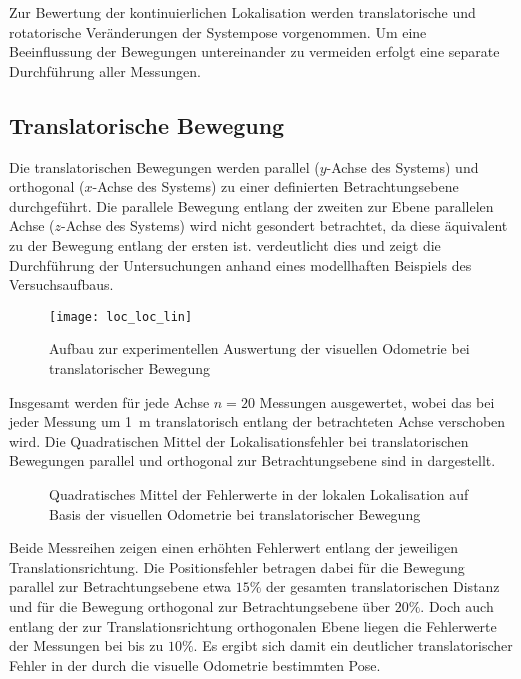 Zur Bewertung der kontinuierlichen Lokalisation werden translatorische und rotatorische Veränderungen der Systempose vorgenommen. Um eine Beeinflussung der Bewegungen untereinander zu vermeiden erfolgt eine separate Durchführung aller Messungen.\\

\subsection{Translatorische Bewegung}
Die translatorischen Bewegungen werden parallel ($y$-Achse des Systems) und orthogonal ($x$-Achse des Systems) zu einer definierten Betrachtungsebene durchgeführt. Die parallele Bewegung entlang der zweiten zur Ebene parallelen Achse ($z$-Achse des Systems) wird nicht gesondert betrachtet, da diese äquivalent zu der Bewegung entlang der ersten ist.  verdeutlicht dies und zeigt die Durchführung der Untersuchungen anhand eines modellhaften Beispiels des Versuchsaufbaus.\\

\begin{figure}[!ht]
	\begin{center}
		\texttt{[image: loc\_loc\_lin]}
		\caption{Aufbau zur experimentellen Auswertung der visuellen Odometrie bei translatorischer Bewegung}
		\label{fig.transmove}
	\end{center}
\end{figure}

Insgesamt werden für jede Achse $n=20$ Messungen ausgewertet, wobei das \kps{} bei jeder Messung um \SI{1}{\meter} translatorisch entlang der betrachteten Achse verschoben wird. Die Quadratischen Mittel der Lokalisationsfehler bei translatorischen Bewegungen parallel und orthogonal zur Betrachtungsebene sind in  dargestellt.

\begin{figure}[!ht]

\caption{Quadratisches Mittel der Fehlerwerte in der lokalen Lokalisation auf Basis der visuellen Odometrie bei translatorischer Bewegung}
\label{fig.loc_loc_trans}
\end{figure}

\vspace{5mm}

Beide Messreihen zeigen einen erhöhten Fehlerwert entlang der jeweiligen Translationsrichtung. Die Positionsfehler betragen dabei für die Bewegung parallel zur Betrachtungsebene etwa $15\%$ der gesamten translatorischen Distanz und für die Bewegung orthogonal zur Betrachtungsebene über $20\%$. Doch auch entlang der zur Translationsrichtung orthogonalen Ebene liegen die Fehlerwerte der Messungen bei bis zu $10\%$. Es ergibt sich damit ein deutlicher translatorischer Fehler in der durch die visuelle Odometrie bestimmten Pose.\\

